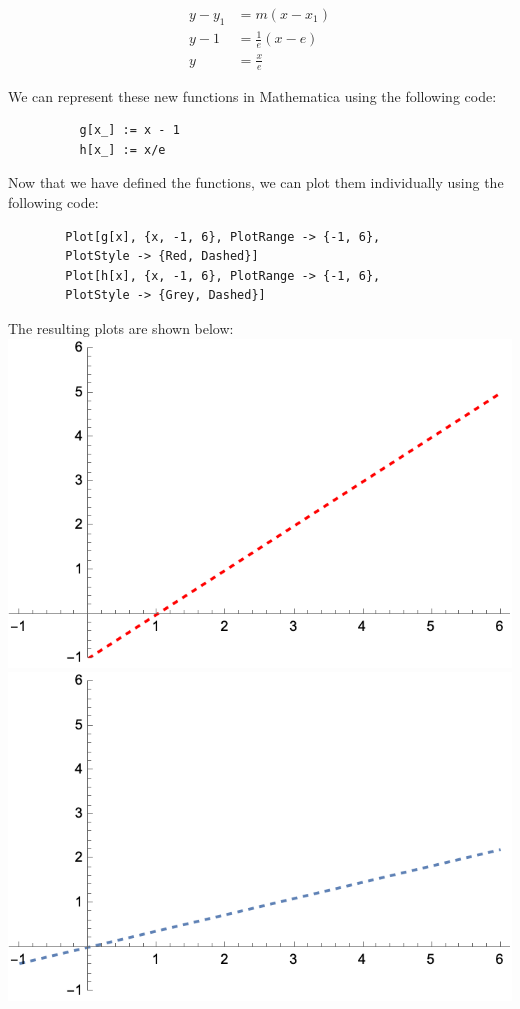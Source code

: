 \documentclass{article}
\begin{document}
    \begin{equation*}
        \begin{split}
            y-y_1 &= m(x-x_1) \\
            y-1 &= \frac{1}{e}(x-e) \\
            y &= \frac{x}{e}
        \end{split}
    \end{equation*}

   We can represent these new functions in Mathematica using the following code: \\
    \begin{verbatim}
          g[x_] := x - 1
          h[x_] := x/e
    \end{verbatim}
    
    Now that we have defined the functions, we can plot them individually using the following code: \\
    \begin{verbatim}
        Plot[g[x], {x, -1, 6}, PlotRange -> {-1, 6}, 
        PlotStyle -> {Red, Dashed}]
        Plot[h[x], {x, -1, 6}, PlotRange -> {-1, 6}, 
        PlotStyle -> {Grey, Dashed}]
    \end{verbatim}

    The resulting plots are shown below: \\
    \includegraphics[scale=0.5]{2.2.1b.png} \\
    \includegraphics[scale=0.5]{2.2.1b2.png} \\
\end{document}
